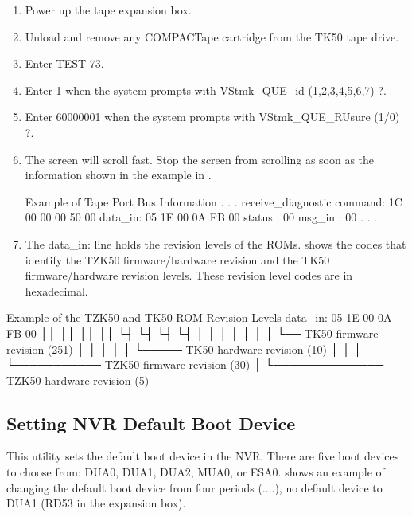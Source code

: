 \begin{enumerate}

\item	Power up the tape expansion box.

\item	Unload and remove any COMPACTape cartridge from the TK50 tape drive.

\item	Enter TEST 73.

\item	Enter 1 when the system prompts with VStmk\_QUE\_id (1,2,3,4,5,6,7) ?.

\item	Enter 60000001 when the system prompts with VStmk\_QUE\_RUsure (1/0) ?.

\item	The screen will scroll fast. Stop the screen from scrolling as soon as the
		information shown in the example in .

\begin{ttfig}{Example of Tape Port Bus Information}
           .
           .
           .
   receive_diagnostic
     command:  1C 00 00 00 50 00
     data_in:  05 1E 00 0A FB 00
     status :  00
     msg_in :  00
           .
           .
           .
\end{ttfig}

\item	The data\_in: line holds the revision levels of the ROMs. 
		shows the codes that identify the TZK50 firmware/hardware revision
		and the TK50 firmware/hardware revision levels. These revision level
		codes are in hexadecimal.
\end{enumerate}
\newpage
\begin{ttfig}{Example of the TZK50 and TK50 ROM Revision Levels}
     data_in:  05 1E 00 0A FB 00
               ││ ││    ││ ││
               └┤ └┤    └┤ └┤
                │  │     │  │
                │  │     │  └── TK50 firmware revision (251)
                │  │     │
                │  │     └───── TK50 hardware revision (10)
                │  │
                │  └─────────── TZK50 firmware revision (30)
                │
                └────────────── TZK50 hardware revision (5)
\end{ttfig}
\subsection{Setting NVR Default Boot Device}

This utility sets the default boot device in the NVR. There are five boot 
devices to choose from: DUA0, DUA1, DUA2, MUA0, or ESA0. 
shows an example of changing the default boot device from four periods
(....), no default device to DUA1 (RD53 in the expansion box).

